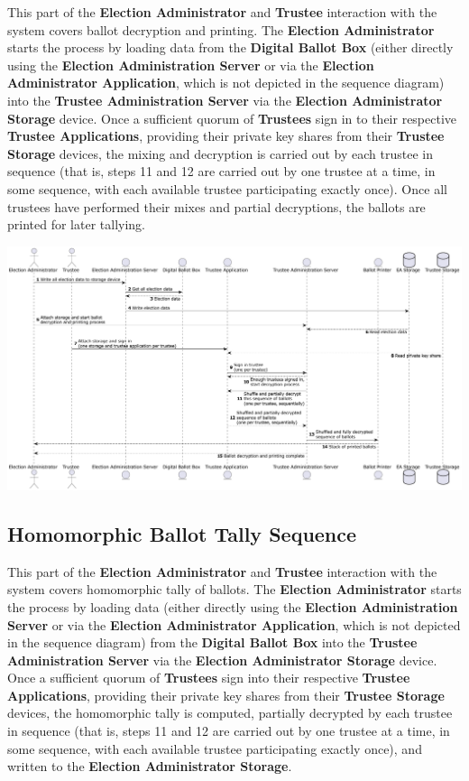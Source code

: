 \documentclass[10pt,letterpaper]{article}
\begin{document}
This part of the \textbf{Election Administrator} and \textbf{Trustee} interaction with the system covers ballot decryption and printing. The \textbf{Election Administrator} starts the process by loading data from the \textbf{Digital Ballot Box} (either directly using the \textbf{Election Administration Server} or via the \textbf{Election Administrator Application}, which is not depicted in the sequence diagram) into the \textbf{Trustee Administration Server} via the \textbf{Election Administrator Storage} device. Once a sufficient quorum of \textbf{Trustees} sign in to their respective \textbf{Trustee Applications}, providing their private key shares from their \textbf{Trustee Storage} devices, the mixing and decryption is carried out by each trustee in sequence (that is, steps 11 and 12 are carried out by one trustee at a time, in some sequence, with each available trustee participating exactly once). Once all trustees have performed their mixes and partial decryptions, the ballots are printed for later tallying.

\includegraphics[width=\textwidth]{diagrams/seq-mix-net-decryption.pdf}

\pagebreak
\subsection{Homomorphic Ballot Tally Sequence}

This part of the \textbf{Election Administrator} and \textbf{Trustee} interaction with the system covers homomorphic tally of ballots. The \textbf{Election Administrator} starts the process by loading data (either directly using the \textbf{Election Administration Server} or via the \textbf{Election Administrator Application}, which is not depicted in the sequence diagram) from the \textbf{Digital Ballot Box} into the \textbf{Trustee Administration Server} via the \textbf{Election Administrator Storage} device. Once a sufficient quorum of \textbf{Trustees} sign into their respective \textbf{Trustee Applications}, providing their private key shares from their \textbf{Trustee Storage} devices, the homomorphic tally is computed, partially decrypted by each trustee in sequence (that is, steps 11 and 12 are carried out by one trustee at a time, in some sequence, with each available trustee participating exactly once), and written to the \textbf{Election Administrator Storage}.
\end{document}
